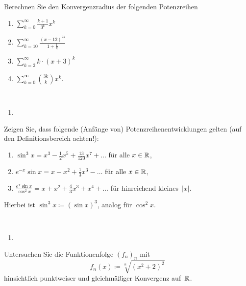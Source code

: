 \begin{aufg}[6 Punkte]
Berechnen Sie den Konvergenzradius der folgenden Potenzreihen
\begin{enumerate}[label=$\mathrm{(\roman*)}$, ref=$\mathrm{\roman*}$]
\item $\sum_{k=0}^\infty \frac{k+1}{3^k}x^k$
\item $\sum_{k=10}^\infty \frac{(x-12)^{2k}}{1+\frac{1}{k}}$
\item $\sum_{k=2}^\infty k\cdot (x+3)^k$
\item $\sum_{k=0}^\infty \binom{3k}{k} x^k$.
\end{enumerate}
\end{aufg}
 
\bigskip


\begin{lsg}\mbox{ }
\begin{enumerate}[label=$\mathrm{(\roman*)}$, ref=$\mathrm{\roman*}$]
\item 
\end{enumerate}
\end{lsg}


\bigskip


\begin{aufg}[6 Punkte]
Zeigen Sie, dass folgende (Anf\"ange von) Potenzreihenentwicklungen gelten (auf 
den Definitionsbereich achten!):
\begin{enumerate}[label=$\mathrm{(\roman*)}$, ref=$\mathrm{\roman*}$]
\item $\sin^3 x = x^3 -\frac12x^5 + \frac{13}{120}x^7 + \ldots$ f\"ur alle 
$x\in\mathbb{R}$,
\item $e^{-x}\sin x = x - x^2 + \frac13x^3 - \ldots$ f\"ur alle $x\in\mathbb{R}$,
\item $\frac{e^x \sin x}{\cos^2 x} = x + x^2 + \frac43 x^3 + x^4 + \ldots$ 
f\"ur hinreichend kleines~$|x|$.
\end{enumerate}
Hierbei ist $\sin^3 x \coloneqq (\sin x)^3$, analog f\"ur $\cos^2 x$.
\end{aufg}


\bigskip


\begin{lsg}\mbox{ }
\begin{enumerate}[label=$\mathrm{(\roman*)}$, ref=$\mathrm{\roman*}$]
\item
\end{enumerate}
\end{lsg}

\bigskip


\begin{aufg}
Untersuchen Sie die Funktionenfolge $(f_n)_n$ mit 
\[
 f_n(x) \coloneqq \sqrt[n]{(x^2+2)^2}
\]
hinsichtlich punktweiser und gleichm\"a{\ss}iger Konvergenz auf~$\mathbb{R}$.
\end{aufg}


